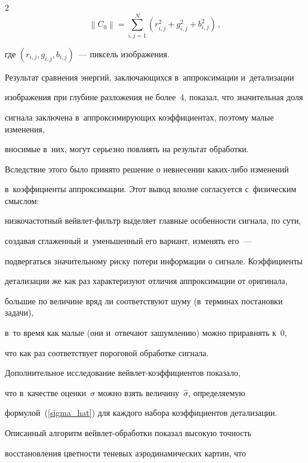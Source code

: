 \begin{multicols}{2}
\begin{equation}
    \left\|C_0\right\|=\sum\limits_{i,j=1}^{N}

    \left({r_{i,j}^2+g_{i,j}^2+b_{i,j}^2}\right)\,,

\label{image_energy}

\end{equation}

где $(r_{i,j},g_{i,j},b_{i,j})$~--- пиксель изображения.



Результат сравнения энергий, заключающихся в~аппроксимации и~детализации 

изображения при глубине разложения не более~4, показал, что значительная доля 

сигнала заключена в~аппроксимирующих коэффициентах, поэтому малые изменения, 

вносимые в~них, могут серьезно повлиять на результат обработки. 

Вследствие этого было принято решение о невнесении ка\-ких-ли\-бо изменений 

в~коэффициенты аппроксимации. Этот вывод вполне согласуется с~физическим смыслом: 

низкочастотный вейв\-лет-фильтр выделяет главные особенности сигнала, по сути, 

создавая сглаженный и~уменьшенный его вариант, изменять его~--- 

подвергаться значительному риску потери информации о сигнале. Коэффициенты 

детализации же как раз характеризуют отличия аппроксимации от оригинала, 

большие по величине вряд ли соответствуют шуму (в~терминах постановки задачи), 

в~то время как малые (они и~отвечают зашумлению) можно приравнять к~0, 

что как раз соответствует пороговой обработке сигнала.



Дополнительное исследование вейв\-лет-ко\-эф\-фи\-ци\-ен\-тов показало, 

что в~качестве оценки~$\sigma$ можно взять величину~$\hat{\sigma}$, определяемую 

формулой~(\ref{sigma_hat}) для каждого набора коэффициентов детализации.





Описанный алгоритм вейв\-лет-об\-ра\-бот\-ки показал высокую точность

восстановления цвет\-ности теневых аэродинамических картин, что


\end{multicols}
